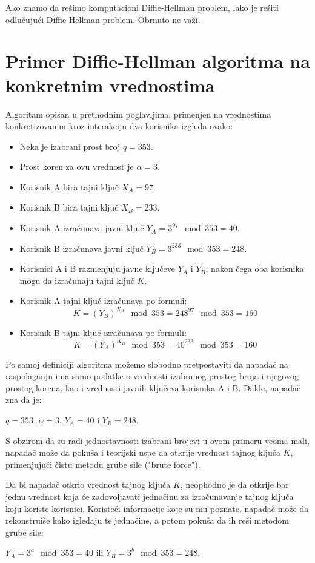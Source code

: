 \documentclass[a4paper]{article}
\begin{document}
Ako znamo da rešimo komputacioni Diffie-Hellman problem, lako je rešiti odlučujući Diffie-Hellman problem.
Obrnuto ne važi. \cite{ddh-vs-cdh}


\section{Primer Diffie-Hellman algoritma na konkretnim vrednostima}
\label{sec:primerDH}

Algoritam opisan u prethodnim poglavljima, primenjen na vrednostima konkretizovanim kroz interakciju dva korisnika izgleda ovako:
\begin{itemize}
  \item Neka je izabrani prost broj $q=353$.
  \item Prost koren za ovu vrednost je $\alpha=3$. 
  \item Korisnik A bira tajni ključ $X_A=97$. \item Korisnik B bira tajni ključ $X_B=233$.
  \item Korisnik A izračunava javni ključ $Y_A=3^{97}\mod353=40$.
  \item Korisnik B izračunava javni ključ $Y_B=3^{233}\mod353=248$.
  \item Korisnici A i B razmenjuju javne ključeve $Y_A$ i $Y_B$, nakon čega oba korisnika mogu da izračunaju tajni ključ $K$.
  \item Korisnik A tajni ključ izračunava po formuli: $$K=(Y_B)^{X_A}\mod353=248^{97}\mod353=160$$
  \item Korisnik B tajni ključ izračunava po formuli: $$K=(Y_A)^{X_B}\mod353=40^{233}\mod353=160$$
\end{itemize}

Po samoj definiciji algoritma možemo slobodno pretpostaviti da napadač na raspolaganju ima samo podatke o vrednosti izabranog prostog broja i njegovog prostog korena, kao i vrednosti javnih ključeva korisnika A i B. Dakle, napadač zna da je: \\\centerline{$q=353$, $\alpha=3$, $Y_A=40$ i $Y_B=248$.}

S obzirom da su radi jednostavnosti izabrani brojevi u ovom primeru veoma mali, napadač može da pokuša i teorijski uspe da otkrije vrednost tajnog ključa $K$, primenjujući čistu metodu grube sile ("brute force").

Da bi napadač otkrio vrednost tajnog ključa $K$, neophodno je da otkrije bar jednu vrednost koja će zadovoljavati jednačinu za izračunavanje tajnog ključa koju koriste korisnici. Koristeći informacije koje su mu poznate, napadač može da rekonstruiše kako igledaju te jednačine, a potom pokuša da ih reši metodom grube sile: \\\centerline{$Y_A=3^a\mod353=40$ ili $Y_B=3^b\mod353=248$.}
\end{document}
